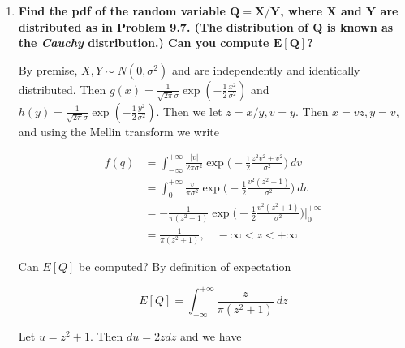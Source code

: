 \documentclass[10pt, oneside]{article}
\begin{document}
\begin{enumerate}[label=9.\arabic*]
\[ G(R) =  \int^{2 \pi}_0 \int^R_0 \frac{R'}{2 \pi \sigma^2} \exp \bigg( -\frac{1}{2} \frac{R'^2}{\sigma^2} \bigg) \ dR' \ d \psi' = \int^R_0 \frac{R'}{\sigma^2} \exp \bigg( -\frac{1}{2} \frac{R'^2}{\sigma^2} \bigg) \ dR'  \]

By the Fundamental Theorem of Calculus, we differentiate with respect to $R$ to get

\[ \frac{d G(R)}{dR} = \boxed{ g(R) = \frac{R}{\sigma^2} \exp \bigg( -\frac{1}{2} \frac{R^2}{\sigma^2} \bigg), \quad R > 0 } \]

Intuitively, we may interpret the Rayleigh distribution to be the probability distribution of a 2-dimensional distance vector with normally distributed constituents.

\item  \begin{tcolorbox}[
  colback=Cerulean!5!white,
  colframe=Cerulean!75!black]
\textbf{Find the pdf of the random variable $\bm{Q = X / Y}$, where $\bm{X}$ and $\bm{Y}$ are distributed as in Problem 9.7. (The distribution of $\bm{Q}$ is known as the \textit{Cauchy} distribution.) Can you compute $\bm{E[Q]}$?}
\end{tcolorbox}

By premise, $X, Y \sim N(0, \sigma^2)$ and are independently and identically distributed. Then $g(x) = \frac{1}{\sqrt{2 \pi} \sigma } \exp (-\frac{1}{2} \frac{x^2}{\sigma^2})$ and $h(y) = \frac{1}{\sqrt{2 \pi} \sigma } \exp (-\frac{1}{2} \frac{y^2}{\sigma^2})$. Then we let $z = x/y, v=y$. Then $x = vz, y = v$, and using the Mellin transform we write

\begin{align*}
f(q) &= \int^{+\infty}_{-\infty} \frac{|v|}{2 \pi \sigma^2} \exp \bigg( -\frac{1}{2} \frac{z^2 v^2 + v^2}{\sigma^2} \bigg) \ dv \\
&= \int^{+\infty}_0 \frac{v}{\pi \sigma^2} \exp \bigg( -\frac{1}{2} \frac{v^2 (z^2 + 1)}{\sigma^2} \bigg) \ dv \\
&= - \frac{1}{\pi (z^2 + 1)} \exp \bigg( -\frac{1}{2} \frac{v^2 (z^2 + 1)}{\sigma^2} \bigg) \bigg|^{+\infty}_0 \\
&= \boxed{ \frac{1}{\pi (z^2 + 1)}, \quad -\infty < z < +\infty }
\end{align*}

Can $E[Q]$ be computed? By definition of expectation

\[ E[Q] = \int^{+\infty}_{-\infty} \frac{z}{\pi (z^2 + 1)} \ dz \]

Let $u = z^2 + 1$. Then $du = 2z dz$ and we have


\end{enumerate}
\end{document}
